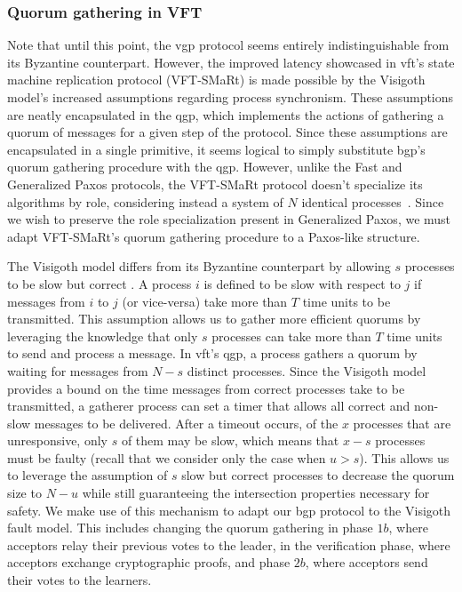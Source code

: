 \subsubsection{Quorum gathering in VFT}
Note that until this point, the \acrshort{vgp} protocol seems entirely indistinguishable from its Byzantine counterpart. However, the improved latency showcased in \acrshort{vft}'s state machine replication protocol (VFT-SMaRt) is made possible by the Visigoth model's increased assumptions regarding process synchronism. These assumptions are neatly encapsulated in the \acrfull{qgp}, which implements the actions of gathering a quorum of messages for a given step of the protocol. Since these assumptions are encapsulated in a single primitive, it seems logical to simply substitute \acrshort{bgp}'s quorum gathering procedure with the \acrshort{qgp}. However, unlike the Fast and Generalized Paxos protocols, the VFT-SMaRt protocol doesn't specialize its algorithms by role, considering instead a system of $N$ identical processes~\cite{Porto2015}. Since we wish to preserve the role specialization present in Generalized Paxos, we must adapt VFT-SMaRt's quorum gathering procedure to a Paxos-like structure.\par
The Visigoth model differs from its Byzantine counterpart by allowing $s$ processes to be slow but correct \cite{Porto2015}. A process $i$ is defined to be slow with respect to $j$ if messages from $i$ to $j$ (or vice-versa) take more than $T$ time units to be transmitted. This assumption allows us to gather more efficient quorums by leveraging the knowledge that only $s$ processes can take more than $T$ time units to send and process a message. In \acrshort{vft}'s \acrfull{qgp}, a process gathers a quorum by waiting for messages from $N-s$ distinct processes. Since the Visigoth model provides a bound on the time messages from correct processes take to be transmitted, a gatherer process can set a timer that allows all correct and non-slow  messages to be delivered. After a timeout occurs, of the $x$ processes that are unresponsive, only $s$ of them may be slow, which means that $x-s$ processes must be faulty (recall that we consider only the case when $u>s$). This allows us to leverage the assumption of $s$ slow but correct processes to decrease the quorum size to $N-u$ while still guaranteeing the intersection properties necessary for safety. We make use of this mechanism to adapt our \acrlong{bgp} protocol to the Visigoth fault model. This includes changing the quorum gathering in phase $1b$, where acceptors relay their previous votes to the leader, in the verification phase, where acceptors exchange cryptographic proofs, and phase $2b$, where acceptors send their votes to the learners. \par
